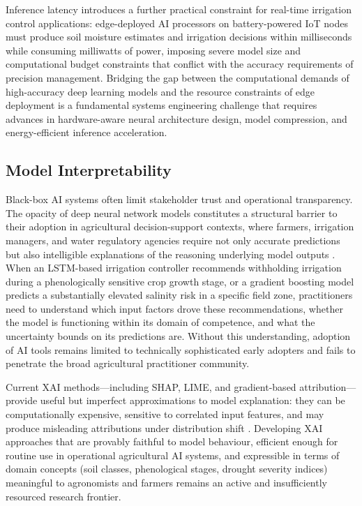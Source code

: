 \documentclass[land,article,submit,pdftex,moreauthors]{Definitions/mdpi}
\numberwithin{equation}{section}
\begin{document}
Inference latency introduces a further practical constraint for real-time irrigation control applications: edge-deployed AI processors on battery-powered IoT nodes must produce soil moisture estimates and irrigation decisions within milliseconds while consuming milliwatts of power, imposing severe model size and computational budget constraints that conflict with the accuracy requirements of precision management. Bridging the gap between the computational demands of high-accuracy deep learning models and the resource constraints of edge deployment is a fundamental systems engineering challenge that requires advances in hardware-aware neural architecture design, model compression, and energy-efficient inference acceleration.

\subsection{Model Interpretability}

Black-box AI systems often limit stakeholder trust and operational transparency. The opacity of deep neural network models constitutes a structural barrier to their adoption in agricultural decision-support contexts, where farmers, irrigation managers, and water regulatory agencies require not only accurate predictions but also intelligible explanations of the reasoning underlying model outputs \citep{arrieta2020explainable}. When an LSTM-based irrigation controller recommends withholding irrigation during a phenologically sensitive crop growth stage, or a gradient boosting model predicts a substantially elevated salinity risk in a specific field zone, practitioners need to understand which input factors drove these recommendations, whether the model is functioning within its domain of competence, and what the uncertainty bounds on its predictions are. Without this understanding, adoption of AI tools remains limited to technically sophisticated early adopters and fails to penetrate the broad agricultural practitioner community.

Current XAI methods---including SHAP, LIME, and gradient-based attribution---provide useful but imperfect approximations to model explanation: they can be computationally expensive, sensitive to correlated input features, and may produce misleading attributions under distribution shift \citep{adebayo2018sanity}. Developing XAI approaches that are provably faithful to model behaviour, efficient enough for routine use in operational agricultural AI systems, and expressible in terms of domain concepts (soil classes, phenological stages, drought severity indices) meaningful to agronomists and farmers remains an active and insufficiently resourced research frontier.
\end{document}

